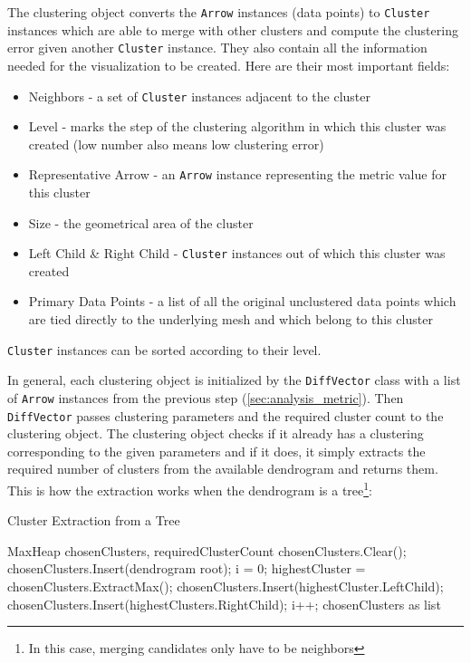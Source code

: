 The clustering object converts the \verb+Arrow+ instances (data points) to \verb+Cluster+ instances which are able to merge with other clusters and compute the clustering error given another \verb+Cluster+ instance. They also contain all the information needed for the visualization to be created. Here are their most important fields:

\begin{itemize}
\item Neighbors - a set of \verb+Cluster+ instances adjacent to the cluster
\item Level - marks the step of the clustering algorithm in which this cluster was created (low number also means low clustering error)
\item Representative Arrow - an \verb+Arrow+ instance representing the metric value for this cluster
\item Size - the geometrical area of the cluster
\item Left Child \& Right Child - \verb+Cluster+ instances out of which this cluster was created
\item Primary Data Points - a list of all the original unclustered data points which are tied directly to the underlying mesh and which belong to this cluster
\end{itemize}

\verb+Cluster+ instances can be sorted according to their level.

In general, each clustering object is initialized by the \verb+DiffVector+ class with a list of \verb+Arrow+ instances from the previous step (\ref{sec:analysis_metric}). Then \verb+DiffVector+ passes clustering parameters and the required cluster count to the clustering object. The clustering object checks if it already has a clustering corresponding to the given parameters and if it does, it simply extracts the required number of clusters from the available dendrogram and returns them. This is how the extraction works when the dendrogram is a tree\footnote{In this case, merging candidates only have to be neighbors}:

\begin{algorithm}[H]
\caption{Cluster Extraction from a Tree}
\begin{algorithmic}[1]

\Require MaxHeap chosenClusters, requiredClusterCount
\Statex
\State chosenClusters.Clear();
\State chosenClusters.Insert(dendrogram root);
\State i = 0;
	\State highestCluster = chosenClusters.ExtractMax();
    \State chosenClusters.Insert(highestCluster.LeftChild);
    \State chosenClusters.Insert(highestClusters.RightChild);
    \State i++;
\EndWhile
\Statex
\Return chosenClusters as list
\end{algorithmic}
\end{algorithm}

